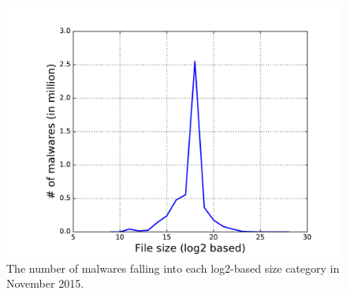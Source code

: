 \begin{figure}[!htb]
  \includegraphics[width=\linewidth]{figure/size}
{The number of malwares falling into each log2-based size category in November 2015.}
\endminipage\hfill

\end{figure}